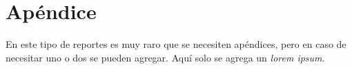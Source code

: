 \section{Apéndice}
\label{sec:Apéndice}

En este tipo de reportes es muy raro que se necesiten apéndices, pero en caso de necesitar uno o dos se pueden agregar. Aquí solo se agrega un \textit{lorem ipsum}.

\lipsum[1-2]

\newpage